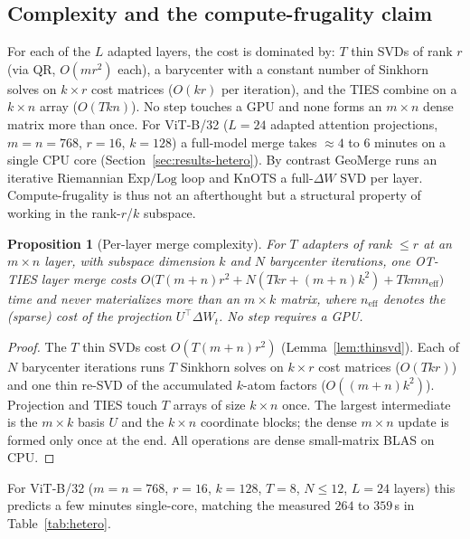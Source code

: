 \documentclass[11pt]{article}
\newtheorem{proposition}{Proposition}
\newcommand{\dW}{\Delta W}
\newcommand{\otties}{\textsc{OT-TIES}}
\begin{document}
\subsection{Complexity and the compute-frugality claim}
\label{sec:method-complexity}
For each of the $L$ adapted layers, the cost is dominated by: $T$ thin SVDs of rank $r$ (via QR,
$O(mr^2)$ each), a barycenter with a constant number of Sinkhorn solves on $k\times r$ cost matrices
($O(k r)$ per iteration), and the TIES combine on a $k\times n$ array ($O(Tkn)$). No step touches a
GPU and none forms an $m\times n$ dense matrix more than once. For ViT-B/32 ($L=24$ adapted attention
projections, $m{=}n{=}768$, $r{=}16$, $k{=}128$) a full-model merge takes $\approx 4$ to $6$ minutes on a
single CPU core (Section~\ref{sec:results-hetero}). By contrast GeoMerge runs an iterative Riemannian
$\mathrm{Exp}/\mathrm{Log}$ loop and KnOTS a full-$\dW$ SVD per layer. Compute-frugality is thus not an
afterthought but a structural property of working in the rank-$r$/$k$ subspace.

\begin{proposition}[Per-layer merge complexity]
\label{prop:complexity}
For $T$ adapters of rank $\le r$ at an $m\times n$ layer, with subspace dimension $k$ and $N$ barycenter
iterations, one \otties{} layer merge costs
$O\!\big(T(m+n)r^2 + N(Tkr + (m+n)k^2) + Tkmn_{\mathrm{eff}}\big)$ time and never materializes more than
an $m\times k$ matrix, where $n_{\mathrm{eff}}$ denotes the (sparse) cost of the projection
$U^\top\dW_t$. No step requires a GPU.
\end{proposition}
\begin{proof}
The $T$ thin SVDs cost $O(T(m+n)r^2)$ (Lemma~\ref{lem:thinsvd}). Each of $N$ barycenter iterations runs
$T$ Sinkhorn solves on $k\times r$ cost matrices ($O(Tkr)$) and one thin re-SVD of the accumulated
$k$-atom factors ($O((m+n)k^2)$). Projection and TIES touch $T$ arrays of size $k\times n$ once. The
largest intermediate is the $m\times k$ basis $U$ and the $k\times n$ coordinate blocks; the dense
$m\times n$ update is formed only once at the end. All operations are dense small-matrix BLAS on CPU.
\end{proof}

\noindent For ViT-B/32 ($m{=}n{=}768$, $r{=}16$, $k{=}128$, $T{=}8$, $N\le 12$, $L{=}24$ layers) this
predicts a few minutes single-core, matching the measured $264$ to $359$\,s in
Table~\ref{tab:hetero}.

\end{document}
